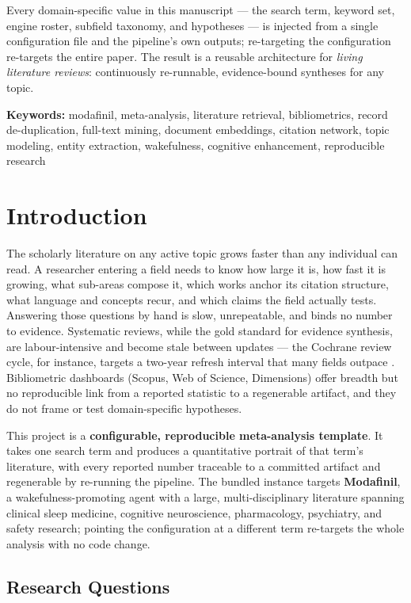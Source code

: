 \documentclass[
  english,
]{article}
\begin{document}
Every domain-specific value in this manuscript --- the search term,
keyword set, engine roster, subfield taxonomy, and hypotheses --- is
injected from a single configuration file and the pipeline's own
outputs; re-targeting the configuration re-targets the entire paper. The
result is a reusable architecture for \emph{living literature reviews}:
continuously re-runnable, evidence-bound syntheses for any topic.

\textbf{Keywords:} modafinil, meta-analysis, literature retrieval,
bibliometrics, record de-duplication, full-text mining, document
embeddings, citation network, topic modeling, entity extraction,
wakefulness, cognitive enhancement, reproducible research

\newpage

\section{Introduction}\label{introduction}

The scholarly literature on any active topic grows faster than any
individual can read. A researcher entering a field needs to know how
large it is, how fast it is growing, what sub-areas compose it, which
works anchor its citation structure, what language and concepts recur,
and which claims the field actually tests. Answering those questions by
hand is slow, unrepeatable, and binds no number to evidence. Systematic
reviews, while the gold standard for evidence synthesis, are
labour-intensive and become stale between updates --- the Cochrane
review cycle, for instance, targets a two-year refresh interval that
many fields outpace \citep{page2021prisma}. Bibliometric dashboards
(Scopus, Web of Science, Dimensions) offer breadth but no reproducible
link from a reported statistic to a regenerable artifact, and they do
not frame or test domain-specific hypotheses.

This project is a \textbf{configurable, reproducible meta-analysis
template}. It takes one search term and produces a quantitative portrait
of that term's literature, with every reported number traceable to a
committed artifact and regenerable by re-running the pipeline. The
bundled instance targets \textbf{Modafinil}, a wakefulness-promoting
agent with a large, multi-disciplinary literature spanning clinical
sleep medicine, cognitive neuroscience, pharmacology, psychiatry, and
safety research; pointing the configuration at a different term
re-targets the whole analysis with no code change.

\subsection{Research Questions}\label{research-questions}
\end{document}
